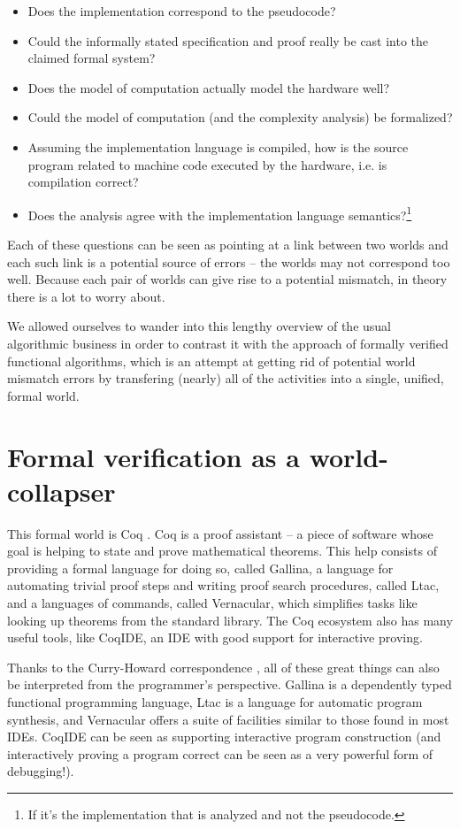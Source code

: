 \documentclass[declaration,mgr,english,shortabstract]{iithesis}
\begin{document}
\begin{itemize}
    \item Does the implementation correspond to the pseudocode?
    \item Could the informally stated specification and proof really be cast into the claimed formal system?
    \item Does the model of computation actually model the hardware well?
    \item Could the model of computation (and the complexity analysis) be formalized?
    \item Assuming the implementation language is compiled, how is the source program related to machine code executed by the hardware, i.e. is compilation correct?\item Does the analysis agree with the implementation language semantics?\footnote{If it's the implementation that is analyzed and not the pseudocode.}
\end{itemize}

Each of these questions can be seen as pointing at a link between two worlds and each such link is a potential source of errors -- the worlds may not correspond too well. Because each pair of worlds can give rise to a potential mismatch, in theory there is a lot to worry about.

We allowed ourselves to wander into this lengthy overview of the usual algorithmic business in order to contrast it with the approach of formally verified functional algorithms, which is an attempt at getting rid of potential world mismatch errors by transfering (nearly) all of the activities into a single, unified, formal world.

\section{Formal verification as a world-collapser} \label{ch1s4}

This formal world is Coq \cite{Coq}. Coq is a proof assistant -- a piece of software whose goal is helping to state and prove mathematical theorems. This help consists of providing a formal language
for doing so, called Gallina, a language for automating trivial proof steps and writing proof search procedures, called Ltac, and a languages of commands, called Vernacular, which simplifies tasks like looking up theorems from the standard library. The Coq ecosystem also has many useful tools, like CoqIDE, an IDE with good support for interactive proving.

Thanks to the Curry-Howard correspondence \cite{CurryHoward}, all of these great things can also be interpreted from the programmer's perspective. Gallina is a dependently typed functional programming language, Ltac is a language for automatic program synthesis, and Vernacular offers a suite of facilities similar to those found in most IDEs. CoqIDE can be seen as supporting interactive program construction (and interactively proving a program correct can be seen as a very powerful form of debugging!).
\end{document}
